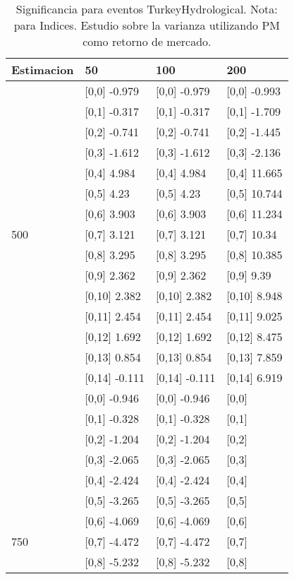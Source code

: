 \begin{table}

\caption{Significancia para eventos TurkeyHydrological. Nota: para Indices. Estudio sobre la varianza utilizando PM como retorno de mercado.}
\centering
\begin{tabular}[t]{llll}
\toprule
Estimacion & 50 & 100 & 200\\
\midrule
 & {}[0,0] -0.979 & {}[0,0] -0.979 & {}[0,0] -0.993\\
 & {}[0,1] -0.317 & {}[0,1] -0.317 & {}[0,1] -1.709\\
 & {}[0,2] -0.741 & {}[0,2] -0.741 & {}[0,2] -1.445\\
 & {}[0,3] -1.612 & {}[0,3] -1.612 & {}[0,3] -2.136\\
 & {}[0,4] 4.984 & {}[0,4] 4.984 & {}[0,4] 11.665\\
\addlinespace
 & {}[0,5] 4.23 & {}[0,5] 4.23 & {}[0,5] 10.744\\
 & {}[0,6] 3.903 & {}[0,6] 3.903 & {}[0,6] 11.234\\
500 & {}[0,7] 3.121 & {}[0,7] 3.121 & {}[0,7] 10.34\\
 & {}[0,8] 3.295 & {}[0,8] 3.295 & {}[0,8] 10.385\\
 & {}[0,9] 2.362 & {}[0,9] 2.362 & {}[0,9] 9.39\\
\addlinespace
 & {}[0,10] 2.382 & {}[0,10] 2.382 & {}[0,10] 8.948\\
 & {}[0,11] 2.454 & {}[0,11] 2.454 & {}[0,11] 9.025\\
 & {}[0,12] 1.692 & {}[0,12] 1.692 & {}[0,12] 8.475\\
 & {}[0,13] 0.854 & {}[0,13] 0.854 & {}[0,13] 7.859\\
 & {}[0,14] -0.111 & {}[0,14] -0.111 & {}[0,14] 6.919\\
\addlinespace
 & {}[0,0] -0.946 & {}[0,0] -0.946 & {}[0,0]\\
 & {}[0,1] -0.328 & {}[0,1] -0.328 & {}[0,1]\\
 & {}[0,2] -1.204 & {}[0,2] -1.204 & {}[0,2]\\
 & {}[0,3] -2.065 & {}[0,3] -2.065 & {}[0,3]\\
 & {}[0,4] -2.424 & {}[0,4] -2.424 & {}[0,4]\\
\addlinespace
 & {}[0,5] -3.265 & {}[0,5] -3.265 & {}[0,5]\\
 & {}[0,6] -4.069 & {}[0,6] -4.069 & {}[0,6]\\
750 & {}[0,7] -4.472 & {}[0,7] -4.472 & {}[0,7]\\
 & {}[0,8] -5.232 & {}[0,8] -5.232 & {}[0,8]\\

\end{tabular}
\end{table}
